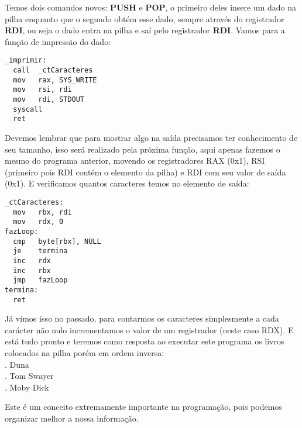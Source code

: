 Temos dois comandos novos: \textbf{PUSH} e \textbf{POP}, o primeiro deles insere um dado na pilha enquanto que o segundo obtém esse dado, sempre através do registrador \textbf{RDI}, ou seja o dado entra na pilha e saí pelo registrador \textbf{RDI}. Vamos para a função de impressão do dado:
\begin{lstlisting}[]
_imprimir:
  call  _ctCaracteres
  mov   rax, SYS_WRITE
  mov   rsi, rdi
  mov   rdi, STDOUT
  syscall
  ret
\end{lstlisting}

Devemos lembrar que para mostrar algo na saída precisamos ter conhecimento de seu tamanho, isso será realizado pela próxima função, aqui apenas fazemos o mesmo do programa anterior, movendo os registradores RAX (0x1), RSI (primeiro pois RDI contém o elemento da pilha) e RDI com seu valor de saída (0x1). E verificamos quantos caracteres temos no elemento de saída:
\begin{lstlisting}[]
_ctCaracteres:
  mov   rbx, rdi
  mov   rdx, 0
fazLoop:
  cmp   byte[rbx], NULL
  je    termina
  inc   rdx
  inc   rbx
  jmp   fazLoop
termina:
  ret 
\end{lstlisting}

Já vimos isso no passado, para contarmos os caracteres simplesmente a cada carácter não nulo incrementamos o valor de um registrador (neste caso RDX). E está tudo pronto e teremos como resposta ao executar este programa os livros colocados na pilha porém em ordem inversa: \\
{. Duna} \\
{. Tom Swayer} \\
{. Moby Dick}

Este é um conceito extremamente importante na programação, pois podemos organizar melhor a nossa informação.
